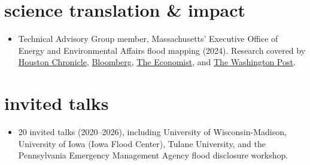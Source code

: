 \documentclass[10pt,oneside]{article}
\begin{document}
\mbox{}\vspace{-\dimexpr\baselineskip\relax}
\vspace*{-1em}
\printbibliography[type=unpublished, heading=none]


\section{science translation \& impact}

\mbox{}\vspace{-\dimexpr\baselineskip\relax}

\begin{itemize}[label={}]

\item Technical Advisory Group member, Massachusetts' Executive Office of Energy and Environmental Affairs flood mapping (2024). Research covered by \href{https://www.houstonchronicle.com/news/investigations/article/fema-flood-risk-study-22309575.php}{Houston Chronicle}, \href{https://www.bloomberg.com/news/articles/2025-12-09/real-estate-climate-risk-score-debate-reveals-limits-of-flood-fire-modeling}{Bloomberg}, \href{https://www.economist.com/graphic-detail/2023/04/25/accounting-for-flood-risk-would-lower-american-house-prices-by-187bn}{The Economist}, and \href{https://www.washingtonpost.com/climate-environment/2023/02/16/flood-risk-housing-market-property-value/}{The Washington Post}.

\end{itemize}

\section{invited talks}

\mbox{}\vspace{-\dimexpr\baselineskip\relax}

\begin{itemize}[label={}]

\item 20 invited talks (2020--2026), including University of Wisconsin-Madison, University of Iowa (Iowa Flood Center), Tulane University, and the Pennsylvania Emergency Management Agency flood disclosure workshop.

\end{itemize}
\end{document}

